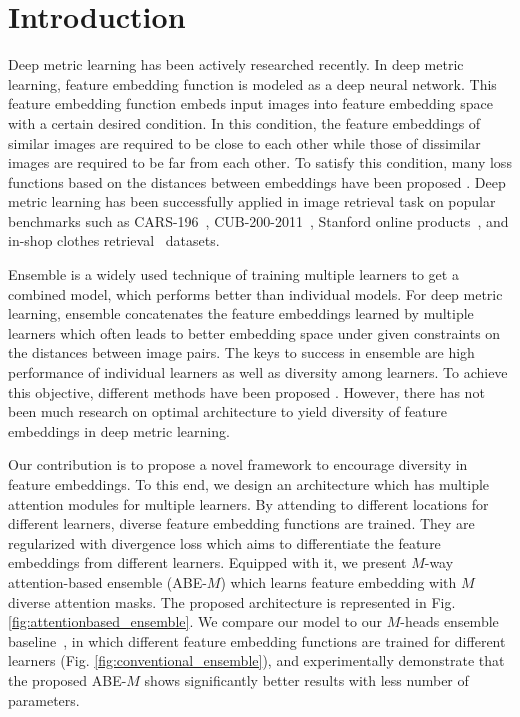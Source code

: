 \documentclass[runningheads]{llncs}
\begin{document}
\vspace{-5mm}
\section{Introduction}
\vspace{-2mm}
Deep metric learning has been actively researched recently.
In deep metric learning, feature embedding function is modeled as a deep neural network.
This feature embedding function embeds input images into feature embedding space with a certain desired condition.
In this condition, the feature embeddings of similar images are required to be close to each other while those of dissimilar images are required to be far from each other.
To satisfy this condition, many loss functions based on the distances between embeddings have been proposed
\cite{bell2015learning,hadsell2006dimensionality,chopra2005learning,weinberger2009distance,schroff2015facenet,oh2016deep,ustinova2016learning,sohn2016improved,song2017deep,law2017deep}.
Deep metric learning has been successfully applied in image retrieval task on popular benchmarks such as CARS-196~\cite{KrauseStarkDengFei-Fei_3DRR2013}, CUB-200-2011~\cite{WahCUB_200_2011}, Stanford online products~\cite{oh2016deep}, and in-shop clothes retrieval~\cite{liu2016deepfashion} datasets.

Ensemble is a widely used technique of training multiple learners to get a combined model, which performs better than individual models.
For deep metric learning, ensemble concatenates the feature embeddings learned by multiple learners which often leads to better embedding space
under given constraints on the distances between image pairs.
The keys to success in ensemble are high performance of individual learners as well as diversity among learners.
To achieve this objective, different methods have been proposed \cite{yuan2016hard,opitz2017bier}.
However, there has not been much research on optimal architecture to yield diversity of feature embeddings in deep metric learning.

Our contribution is to propose a novel framework to encourage diversity in feature embeddings.
To this end, we design an architecture which has multiple attention modules for multiple learners.
By attending to different locations for different learners, diverse feature embedding functions are trained.
They are regularized with divergence loss which aims to differentiate the feature embeddings from different learners.
Equipped with it, we present $M$-way attention-based ensemble (ABE-$M$) which learns feature embedding with $M$ diverse attention masks.
The proposed architecture is represented in Fig. \ref{fig:attentionbased_ensemble}.
We compare our model to our $M$-heads ensemble baseline~\cite{lee2015m}, in which different feature embedding functions are trained for different learners (Fig. \ref{fig:conventional_ensemble}),
and experimentally demonstrate that the proposed ABE-$M$ shows significantly better results with less number of parameters.
\end{document}
